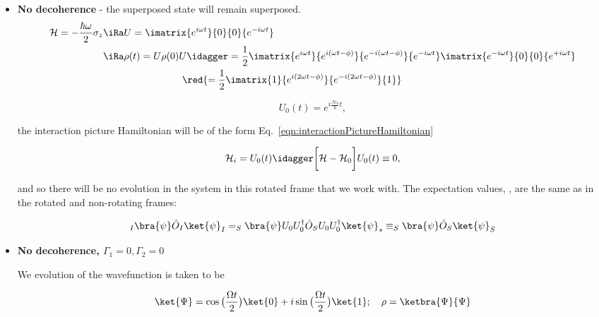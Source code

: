  \begin{itemize}
 	\item \textbf{ No decoherence} - the superposed state will remain superposed.
 	\[	
	 	\begin{aligned}
	 	\mathcal{H} = -\frac{\hbar\omega}{2}\sigma_z &\iRa  U = \imatrix{e^{i\omega t}}{0}{0}{e^{-i\omega t}}\\
	 	&\iRa \rho(t) = U\rho(0)U\idagger = \frac{1}{2}\imatrix{e^{i\omega t}}{e^{i(\omega t - \phi)}}{e^{-i(\omega t - \phi)}}{e^{-i\omega t}}\imatrix{e^{-i\omega t}}{0}{0}{e^{+i\omega t}}\\
	 	&\qquad \qquad\qquad\qquad\red{= \frac{1}{2}\imatrix{1}{e^{i(2\omega t - \phi)}}{e^{-i(2\omega t - \phi)}}{1}}
	 	\end{aligned}
 	\]
 	
 	
 	\[
 		U_0(t) = e^{i\frac{\mathcal{H}_0}{\hbar}t},	
 	\]
 	
 	\noindent the interaction picture Hamiltonian will be of the form Eq.~\eqref{eqn:interactionPictureHamiltonian}
 	
 	\[
 		\mathcal{H}_i = U_0(t)\idagger\bigg[\mathcal{H} - \mathcal{H}_0\bigg]U_0(t) \equiv 0,
 	\]
 	
 	\noindent and so there will be no evolution in the system in this rotated frame that we work with. The expectation values, \isigmax, \isigmaz are the same as in the rotated and non-rotating frames:
 	
 	\begin{equation}
 	_I\bra{\psi}\hat{O}_I\ket{\psi}_I = _S\bra{\psi}U_0U_0^\dagger\hat{O}_SU_0U_0^\dagger\ket{\psi}_s \equiv _S\bra{\psi}\hat{O}_S\ket{\psi}_S
 	\end{equation}
 	

 	
 
 	\newpage
 	\item \textbf{ No decoherence, $ \Gamma_1 = 0, \Gamma_2 = 0 $}
 	
 	We evolution of the wavefunction is taken to be 
 	
 	\begin{equation}\label{dunamicState}
 	\ket{\Psi} = \cos\big(\frac{\Omega t}{2}\big)\ket{0}+i\sin\big(\frac{\Omega t}{2}\big)\ket{1};\quad\rho=\ketbra{\Psi}{\Psi}
 	\end{equation}
 	

\end{itemize}
